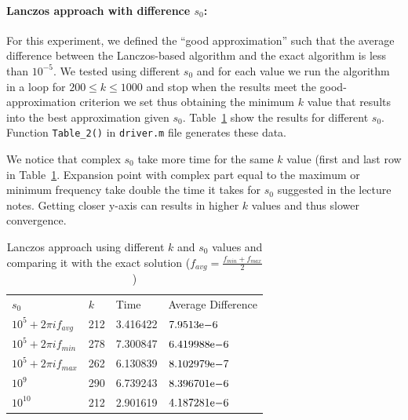 \paragraph{Lanczos approach with difference $s_{0}$:} For this experiment, we defined the ``good approximation'' such that the average difference between the Lanczos-based algorithm and the exact algorithm is less than  $10^{-5}$. We tested using different $s_{0}$ and for each value we run the algorithm in a loop for $200\leq k \leq 1000$ and stop when the results meet the good-approximation criterion we set thus obtaining the minimum $k$ value that results into the best approximation given $s_{0}$. Table~\ref{tab:s0} show the results for different $s_{0}$. Function \texttt{Table\_2()} in \texttt{driver.m} file generates these data.

We notice that complex $s_{0}$ take more time for the same $k$ value (first and last row in Table~\ref{tab:s0}. Expansion point with complex part equal to the maximum or minimum frequency take double the time it takes for $s_{0}$ suggested in the lecture notes. Getting closer y-axis can results in higher $k$ values and thus slower convergence. 


\begin{table}[!tbh]
 \centering    
\begin{tabular}{ |p{3.0cm}|p{1.5cm}| p{4cm}|| p{4cm}|}
\hline
 $s_{0}$  & $k$ & Time & Average Difference \\ \hhline{|=|=|=|=|}   
 $10^{5} + 2 \pi i f_{avg}$  & 212 & 3.416422 & ${7.9513}\mathrm{e}{-6}$\\
 $10^{5} + 2 \pi i f_{min}$ & 278 & 7.300847 & ${6.419988}\mathrm{e}{-6}$\\
 $10^{5} + 2 \pi i f_{max}$ & 262 & 6.130839 & ${8.102979}\mathrm{e}{-7}$ \\
 $10^{9} $                  & 290 & 6.739243 & ${8.396701}\mathrm{e}{-6}$ \\
 $10^{10}$                  & 212 & 2.901619 & ${4.187281}\mathrm{e}{-6}$  \\  
\hline
\end{tabular} 
\caption{Lanczos approach using different $k$ and $s_{0}$ values and comparing it with the exact solution ($f_{avg} = \frac{f_{min}+f_{max}}{2}$) }
   \label{tab:s0}
\end{table}